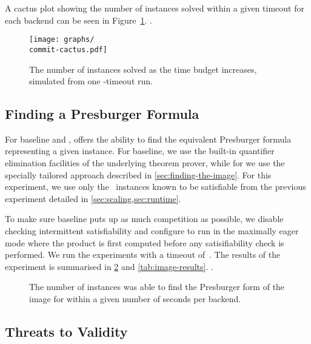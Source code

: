 \documentclass[acmsmall,review,anonymous,screen]{acmart}\settopmatter{printfolios=true,printccs=false,printacmref=true}
\theoremstyle{definition}
\begin{document}
A cactus plot showing the number of instances solved within a given timeout for each backend can be seen in Figure~\ref{fig:cactus}. .

\begin{figure}[ht]
  \texttt{[image: graphs/\\commit-cactus.pdf]}
  \caption{The number of instances solved as the time budget increases, simulated from one \RuntimeTimeout-timeout run.}
  \label{fig:cactus}
\end{figure}

\subsection{Finding a Presburger Formula}\label{sec:evaluation:finding-image}

For baseline and \Calculus{}, \Catra{} offers the ability to find the equivalent Presburger formula representing a given instance. For baseline, we use the built-in quantifier elimination facilities of the underlying \Princess{} theorem prover, while for \Catra{} we use the specially tailored approach described in \cref{sec:finding-the-image}. For this experiment, we use only the~\NrKnownSat{} instances known to be satisfiable from the previous experiment detailed in \cref{sec:scaling,sec:runtime}. 

To make sure baseline puts up as much competition as possible, we disable
checking intermittent satisfiability and configure \Catra{} to run in the
maximally eager mode where the product is first computed before any
satisifiability check is performed. We run the experiments with a timeout
of~\ImageTimeout{}. The results of the experiment is summarised in
\cref{fig:cactus:image} and \cref{tab:image-results}. .

\begin{figure}[ht]
  \caption{The number of instances \Catra{} was able to find the Presburger form of the image for within a given number of seconds per backend.}
  \label{fig:cactus:image}
\end{figure}

\subsection{Threats to Validity}
\end{document}
